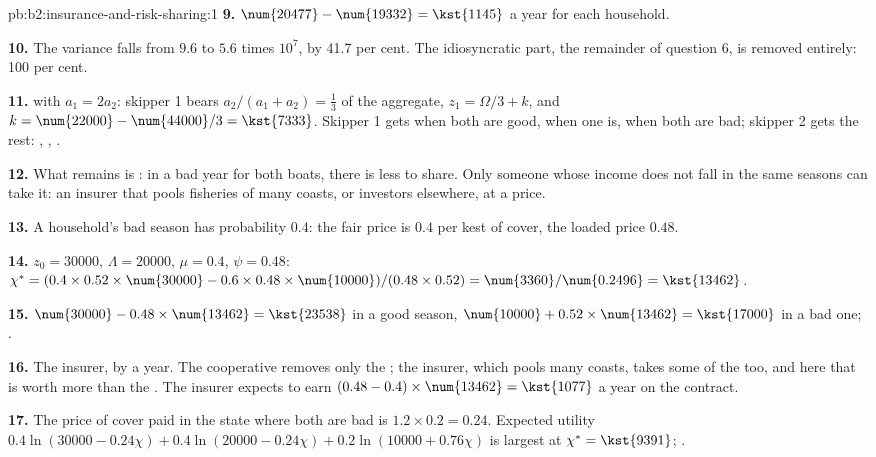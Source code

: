 \begin{solution}{pb:b2:insurance-and-risk-sharing:1}
\textbf{9.} $\num{20477} - \num{19332} = \kst{1145}$ a year for each household.

\textbf{10.} The variance falls from $9.6$ to $5.6$ times $10^7$, by 41.7 per cent. The idiosyncratic
part, the remainder of question 6, is removed entirely: 100 per cent.

\textbf{11.}  with $a_1 = 2a_2$: skipper 1 bears
$a_2/(a_1 + a_2) = \tfrac13$ of the aggregate, $z_1 = \Omega/3 + k$, and $k = \num{22000} -
\num{44000}/3 = \kst{7333}$. Skipper 1 gets  when both are good,  when one is,
 when both are bad; skipper 2 gets the rest: , , .

\textbf{12.} What remains is : in a bad year for both boats, there is less to share.
Only someone whose income does not fall in the same seasons can take it: an insurer that pools
fisheries of many coasts, or investors elsewhere, at a price.

\textbf{13.} A household's bad season has probability $0.4$: the fair price is $0.4$ per kest of cover,
the loaded price $0.48$.

\textbf{14.} $z_0 = \num{30000}$, $\Lambda = \num{20000}$, $\mu = 0.4$, $\psi = 0.48$: $\chi^{*} =
(0.4 \times 0.52 \times \num{30000} - 0.6 \times 0.48 \times \num{10000})/(0.48 \times 0.52) =
\num{3360}/\num{0.2496} = \kst{13462}$.

\textbf{15.} $\num{30000} - 0.48 \times \num{13462} = \kst{23538}$ in a good season, $\num{10000} +
0.52 \times \num{13462} = \kst{17000}$ in a bad one;  .

\textbf{16.} The insurer, by  a year. The cooperative removes only the ; the
insurer, which pools many coasts, takes some of the  too, and here that is worth more than
the . The insurer expects to earn $(0.48 - 0.4) \times \num{13462} = \kst{1077}$ a year on the
contract.

\textbf{17.} The price of cover paid in the state where both are bad is $1.2 \times 0.2 = 0.24$.
Expected utility $0.4\ln(\num{30000} - 0.24\chi) + 0.4\ln(\num{20000} - 0.24\chi) + 0.2\ln(\num{10000}
+ 0.76\chi)$ is largest at $\chi^{*} = \kst{9391}$;  .


\end{solution}
